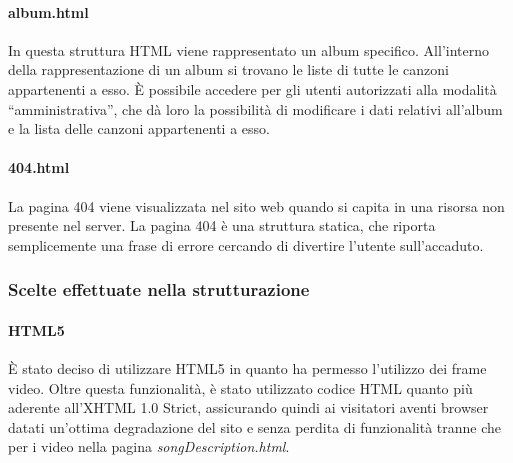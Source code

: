 \paragraph*{album.html} In questa struttura HTML viene rappresentato un album specifico. All'interno della rappresentazione di un album si trovano le liste di tutte le canzoni appartenenti a esso. È possibile accedere per gli utenti autorizzati alla modalità ``amministrativa'', che d\`a loro la possibilità di modificare i dati relativi all'album e la lista delle canzoni appartenenti a esso. %

\paragraph*{404.html} La pagina 404 viene visualizzata nel sito web quando si capita in una risorsa non presente nel server. La pagina 404 è una struttura statica, che riporta semplicemente una frase di errore cercando di divertire l'utente sull'accaduto.

\subsubsection{Scelte effettuate nella strutturazione}

\paragraph{HTML5}
È stato deciso di utilizzare HTML5 in quanto ha permesso l'utilizzo dei frame video. Oltre questa funzionalità, è stato utilizzato codice HTML quanto più aderente all'XHTML 1.0 Strict, assicurando quindi ai visitatori aventi browser datati un'ottima degradazione del sito e senza perdita di funzionalità tranne che per i video nella pagina \textit{songDescription.html}.
